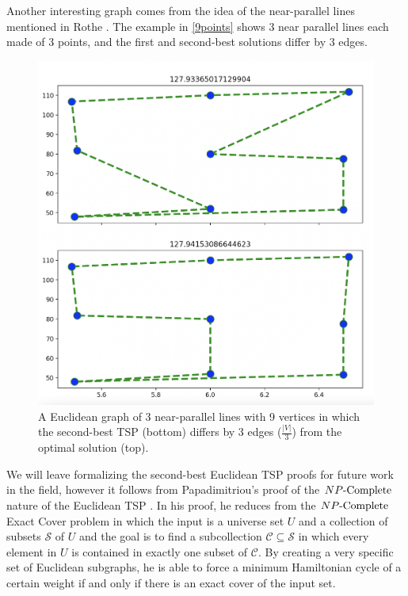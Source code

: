 Another interesting graph comes from the idea of the near-parallel lines mentioned in Rothe \cite{rothe1988two}. The example in \autoref{9points} shows 3 near parallel lines each made of 3 points, and the first and second-best solutions differ by 3 edges. 

\begin{figure}[!ht]
	\centering
	\includegraphics[width=\textwidth, height=.5\textheight, keepaspectratio]{images/9points.png}
	\caption{A Euclidean graph of 3 near-parallel lines with 9 vertices in which the second-best TSP (bottom) differs by 3 edges ($\frac{|V|}{3}$) from the optimal solution (top).}\label{9points}
\end{figure}


We will leave formalizing the second-best Euclidean TSP proofs for future work in the field, however it follows from Papadimitriou's proof of the ${NP\text{-Complete}}{}$ nature of the Euclidean TSP \cite{papadimitriou1977euclidean}. In his proof, he reduces from the ${NP\text{-Complete}}{}$ Exact Cover problem in which the input is a universe set $U$ and a collection of subsets $\mathcal{S}$ of $U$ and the goal is to find a subcollection $\mathcal{C} \subseteq \mathcal{S}$ in which every element in $U$ is contained in exactly one subset of $\mathcal{C}$. By creating a very specific set of Euclidean subgraphs, he is able to force a minimum Hamiltonian cycle of a certain weight if and only if there is an exact cover of the input set.

